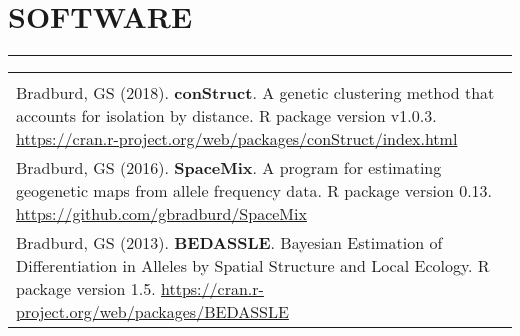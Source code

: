 \documentclass{article}
\begin{document}
\section*{SOFTWARE}
\vspace{-0.6cm}
\rule{470pt}{0.4pt}
\begin{tabular}{>{\everypar{\hangindent1cm}}p{}}
\hfill\\
%
Bradburd, GS (2018). \textbf{conStruct}. A genetic clustering method that accounts for isolation by distance. R package version v1.0.3.
\href{https://cran.r-project.org/web/packages/conStruct/index.html}{https://cran.r-project.org/web/packages/conStruct/index.html}\\
%
\vspace{-0.1cm}
%
Bradburd, GS (2016). \textbf{SpaceMix}. A program for estimating geogenetic maps from allele frequency data. R package version 0.13.
\href{https://github.com/gbradburd/SpaceMix}{https://github.com/gbradburd/SpaceMix}\\
%
\vspace{-0.1cm}
%
Bradburd, GS (2013). \textbf{BEDASSLE}. Bayesian Estimation of Differentiation in Alleles by Spatial Structure and Local Ecology. 
R package version 1.5. \href{https://cran.r-project.org/web/packages/BEDASSLE}{https://cran.r-project.org/web/packages/BEDASSLE}\\
%
\end{tabular}
%
\end{document}
